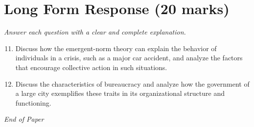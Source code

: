 \documentclass[12pt]{article}
\begin{document}
\section*{Long Form Response (20 marks)}
\textit{Answer each question with a clear and complete explanation.}
\begin{enumerate}[label=\arabic*.]
\setcounter{enumi}{10}
\item Discuss how the emergent-norm theory can explain the behavior of individuals in a crisis, such as a major car accident, and analyze the factors that encourage collective action in such situations.
\item Discuss the characteristics of bureaucracy and analyze how the government of a large city exemplifies these traits in its organizational structure and functioning.
\end{enumerate}

\vfill
\noindent\textit{End of Paper}
\end{document}
